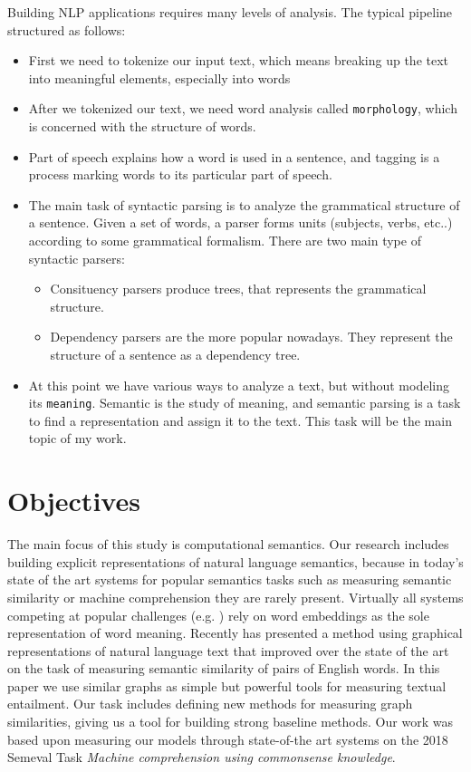 Building NLP applications requires many levels of analysis.
The typical pipeline structured as follows:
\begin{itemize}
	\item First we need to tokenize our input text, which means breaking up the text into meaningful elements, especially into words
	\item After we tokenized our text, we need word analysis called \texttt{morphology}, which is concerned with the structure of words.
	\item Part of speech explains how a word is used in a sentence, and tagging is a process marking words to its particular part of speech.
	\item The main task of syntactic parsing is to analyze the grammatical structure of a sentence. Given a set of words, a parser forms units (subjects, verbs, etc..) according to some grammatical formalism.
	There are two main type of syntactic parsers:
	\begin{itemize}
		\item Consituency parsers produce trees, that represents the grammatical structure.
		\item Dependency parsers are the more popular nowadays. They represent the structure of a sentence as a dependency tree.
	\end{itemize}
	\item At this point we have various ways to analyze a text, but without modeling its \texttt{meaning}. Semantic is the study of meaning, and semantic parsing is a task to find a representation and assign it to the text. This task will be the main topic of my work.
\end{itemize}

\section{Objectives}
The main focus of this study is computational semantics. Our research includes building explicit representations of natural language semantics, because in today's state of the art systems for popular semantics tasks such as measuring semantic similarity or machine comprehension they are rarely present. Virtually all systems
competing at popular challenges (e.g. \cite{Cer:2017,Collados:2017}) rely on word embeddings as the sole representation of word meaning. Recently \cite{Recski:2016c} has presented a method using graphical representations of natural language text that improved over the state of the art on the task of
measuring semantic similarity of pairs of English words. In this paper
we use similar graphs as simple but powerful tools for measuring textual
entailment. Our task includes defining new methods for measuring graph similarities, giving us a tool for building strong baseline methods. Our work was based upon measuring our models through state-of-the art systems on the 2018 Semeval Task \textit{Machine comprehension using commonsense knowledge}.

